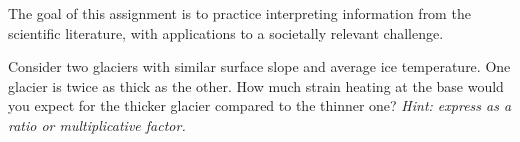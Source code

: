 \documentclass[12pt]{article}
\newenvironment{problem}[2][Problem]{\begin{trivlist}
\item[\hskip \labelsep {\bfseries #1}\hskip \labelsep {\bfseries #2.}]}{\end{trivlist}}
\begin{document}
\pagestyle{fancy}
\fancyhf{}


\noindent The goal of this assignment is to practice interpreting information from the scientific literature, with applications to a societally relevant challenge.


\begin{problem}{1}
[2 points] Consider two glaciers with similar surface slope and average ice temperature.  One glacier is twice as thick as the other.  How much strain heating at the base would you expect for the thicker glacier compared to the thinner one?  {\em Hint: express as a ratio or multiplicative factor.}
\end{problem}
\end{document}
